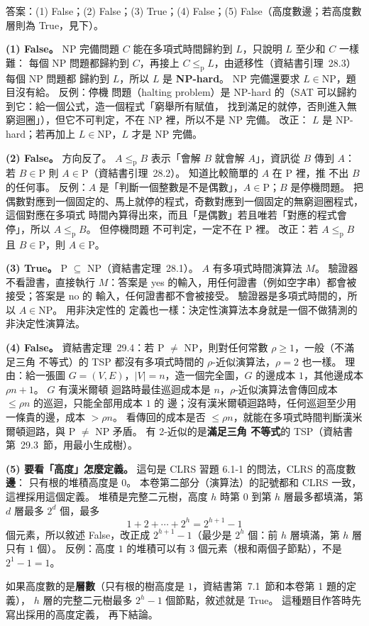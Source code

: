 \begin{pastsoln}
答案：(1) False；(2) False；(3) True；(4) False；(5) False（高度數邊；若高度數層則為 True，見下）。

\textbf{(1) False。} NP 完備問題 $C$ 能在多項式時間歸約到 $L$，只說明 $L$ 至少和 $C$ 一樣難：
每個 NP 問題都歸約到 $C$，再接上 $C \le_{\mathrm p} L$，由遞移性（資結書引理~28.3）每個 NP 問題都
歸約到 $L$，所以 $L$ 是 \textbf{NP-hard}。 NP 完備還要求 $L \in \mathrm{NP}$，題目沒有給。 反例：停機
問題（halting problem）是 NP-hard 的（SAT 可以歸約到它：給一個公式，造一個程式「窮舉所有賦值，
找到滿足的就停，否則進入無窮迴圈」），但它不可判定，不在 NP 裡，所以不是 NP 完備。 改正：
$L$ 是 NP-hard；若再加上 $L \in \mathrm{NP}$，$L$ 才是 NP 完備。

\textbf{(2) False。} 方向反了。 $A \le_{\mathrm p} B$ 表示「會解 $B$ 就會解 $A$」，資訊從 $B$ 傳到
$A$：若 $B \in \mathrm{P}$ 則 $A \in \mathrm{P}$（資結書引理~28.2）。 知道比較簡單的 $A$ 在 P 裡，推
不出 $B$ 的任何事。 反例：$A$ 是「判斷一個整數是不是偶數」，$A \in \mathrm{P}$；$B$ 是停機問題。
把偶數對應到一個固定的、馬上就停的程式，奇數對應到一個固定的無窮迴圈程式，這個對應在多項式
時間內算得出來，而且「是偶數」若且唯若「對應的程式會停」，所以 $A \le_{\mathrm p} B$。 但停機問題
不可判定，一定不在 P 裡。 改正：若 $A \le_{\mathrm p} B$ 且 $B \in \mathrm{P}$，則 $A \in \mathrm{P}$。

\textbf{(3) True。} P $\subseteq$ NP（資結書定理~28.1）。 $A$ 有多項式時間演算法 $M$。 驗證器
不看證書，直接執行 $M$：答案是 yes 的輸入，用任何證書（例如空字串）都會被接受；答案是 no 的
輸入，任何證書都不會被接受。 驗證器是多項式時間的，所以 $A \in \mathrm{NP}$。 用非決定性的
定義也一樣：決定性演算法本身就是一個不做猜測的非決定性演算法。

\textbf{(4) False。} 資結書定理~29.4：若 P $\ne$ NP，則對任何常數 $\rho \ge 1$，一般（不滿足三角
不等式）的 TSP 都沒有多項式時間的 $\rho$-近似演算法，$\rho = 2$ 也一樣。 理由：給一張圖
$G = (V, E)$，$|V| = n$，造一個完全圖，$G$ 的邊成本 $1$，其他邊成本 $\rho n + 1$。 $G$ 有漢米爾頓
迴路時最佳巡迴成本是 $n$，$\rho$-近似演算法會傳回成本 $\le \rho n$ 的巡迴，只能全部用成本 $1$ 的
邊；沒有漢米爾頓迴路時，任何巡迴至少用一條貴的邊，成本 $> \rho n$。 看傳回的成本是否
$\le \rho n$，就能在多項式時間判斷漢米爾頓迴路，與 P $\ne$ NP 矛盾。 有 2-近似的是\textbf{滿足三角
不等式}的 TSP（資結書第~29.3~節，用最小生成樹）。

\textbf{(5) 要看「高度」怎麼定義。} 這句是 CLRS 習題 6.1-1 的問法，CLRS 的高度數\textbf{邊}：
只有根的堆積高度是 $0$。 本卷第二部分（演算法）的記號都和 CLRS 一致，這裡採用這個定義。
堆積是完整二元樹，高度 $h$ 時第 $0$ 到第 $h$ 層最多都填滿，第 $d$ 層最多 $2^d$ 個，最多
\[
1 + 2 + \cdots + 2^h = 2^{h+1} - 1
\]
個元素，所以敘述 False，改正成 $2^{h+1} - 1$（最少是 $2^h$ 個：前 $h$ 層填滿，第 $h$ 層只有
$1$ 個）。 反例：高度 $1$ 的堆積可以有 $3$ 個元素（根和兩個子節點），不是 $2^1 - 1 = 1$。

如果高度數的是\textbf{層數}（只有根的樹高度是 $1$，資結書第~7.1~節和本卷第 1 題的定義），
$h$ 層的完整二元樹最多 $2^h - 1$ 個節點，敘述就是 True。 這種題目作答時先寫出採用的高度定義，
再下結論。
\end{pastsoln}
